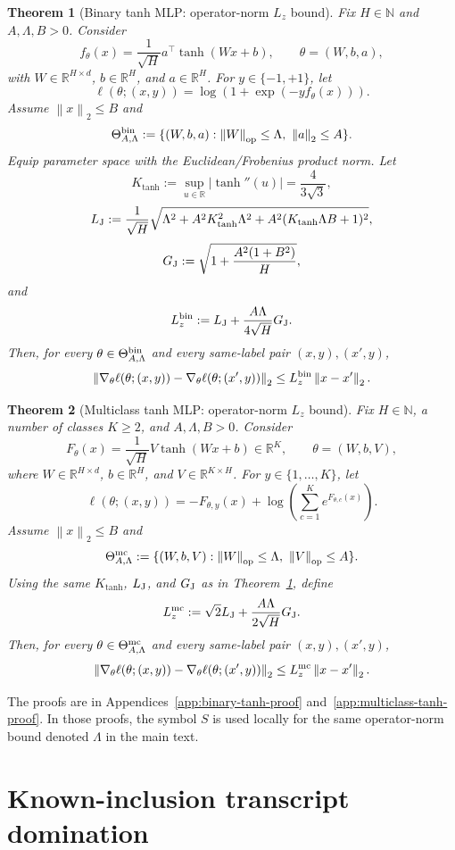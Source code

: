 \documentclass[11pt,a4paper]{report}
\theoremstyle{plain}
\newtheorem{theorem}{Theorem}[chapter]
\theoremstyle{definition}
\theoremstyle{remark}
\newcommand{\R}{\mathbb{R}}
\newcommand{\op}{\mathrm{op}}
\newcommand{\norm}[1]{\left\lVert #1\right\rVert}
\begin{document}
\begin{theorem}[Binary tanh MLP: operator-norm $L_z$ bound]
\label{thm:binary-tanh-op-lz}
Fix $H\in\mathbb N$ and $A,\Lambda,B>0$.  Consider
\[
f_\theta(x)=\frac1{\sqrt H}a^\top\tanh(Wx+b),
\qquad
\theta=(W,b,a),
\]
with $W\in\R^{H\times d}$, $b\in\R^H$, and $a\in\R^H$.  For $y\in\{-1,+1\}$, let
\[
\ell(\theta;(x,y))=\log(1+\exp(-yf_\theta(x))).
\]
Assume $\norm{x}_2\le B$ and
\[
\Theta_{A,\Lambda}^{\rm bin}
:=
\{(W,b,a):\norm{W}_{\op}\le\Lambda,\ \norm{a}_2\le A\}.
\]
Equip parameter space with the Euclidean/Frobenius product norm.  Let
\[
K_{\tanh}:=\sup_{u\in\R}|\tanh''(u)|=\frac4{3\sqrt3},
\]
\[
L_{\rm J}
:=
\frac1{\sqrt H}
\sqrt{
\Lambda^2+A^2K_{\tanh}^2\Lambda^2+A^2(K_{\tanh}\Lambda B+1)^2},
\]
\[
G_{\rm J}
:=
\sqrt{1+\frac{A^2(1+B^2)}{H}},
\]
and
\[
L_z^{\rm bin}:=L_{\rm J}+\frac{A\Lambda}{4\sqrt H}G_{\rm J}.
\]
Then, for every $\theta\in\Theta_{A,\Lambda}^{\rm bin}$ and every same-label pair $(x,y),(x',y)$,
\[
\norm{\nabla_\theta\ell(\theta;(x,y))-\nabla_\theta\ell(\theta;(x',y))}_2
\le
L_z^{\rm bin}\norm{x-x'}_2.
\]
\end{theorem}

\begin{theorem}[Multiclass tanh MLP: operator-norm $L_z$ bound]
\label{thm:multiclass-tanh-op-lz}
Fix $H\in\mathbb N$, a number of classes $K\ge2$, and $A,\Lambda,B>0$.  Consider
\[
F_\theta(x)=\frac1{\sqrt H}V\tanh(Wx+b)\in\R^K,
\qquad
\theta=(W,b,V),
\]
where $W\in\R^{H\times d}$, $b\in\R^H$, and $V\in\R^{K\times H}$.  For $y\in\{1,\ldots,K\}$, let
\[
\ell(\theta;(x,y))
=
-F_{\theta,y}(x)+\log\left(\sum_{c=1}^K e^{F_{\theta,c}(x)}\right).
\]
Assume $\norm{x}_2\le B$ and
\[
\Theta_{A,\Lambda}^{\rm mc}
:=
\{(W,b,V):\norm{W}_{\op}\le\Lambda,\ \norm{V}_{\op}\le A\}.
\]
Using the same $K_{\tanh}$, $L_{\rm J}$, and $G_{\rm J}$ as in Theorem~\ref{thm:binary-tanh-op-lz}, define
\[
L_z^{\rm mc}:=\sqrt2L_{\rm J}+\frac{A\Lambda}{2\sqrt H}G_{\rm J}.
\]
Then, for every $\theta\in\Theta_{A,\Lambda}^{\rm mc}$ and every same-label pair $(x,y),(x',y)$,
\[
\norm{\nabla_\theta\ell(\theta;(x,y))-\nabla_\theta\ell(\theta;(x',y))}_2
\le
L_z^{\rm mc}\norm{x-x'}_2.
\]
\end{theorem}

The proofs are in Appendices~\ref{app:binary-tanh-proof} and~\ref{app:multiclass-tanh-proof}.  In those proofs, the symbol $S$ is used locally for the same operator-norm bound denoted $\Lambda$ in the main text.

\section{Known-inclusion transcript domination}
\label{sec:known-inclusion-domination}
\end{document}
